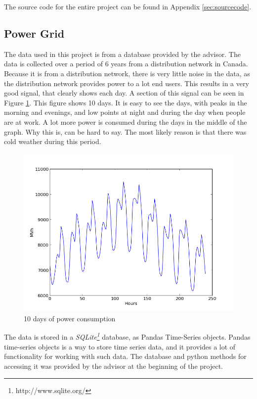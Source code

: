 \documentclass[12pt]{article}
\begin{document}
	The source code for the entire project can be found in Appendix \ref{sec:sourcecode}.
	\subsection{Power Grid}
		\label{sec:powergrid}
		The data used in this project is from a database provided by the advisor. The data is collected over a period of 6 years from a distribution network in Canada. Because it is from a distribution network, there is very little noise in the data, as the distribution network provides power to a lot end users. This results in a very good signal, that clearly shows each day. A section of this signal can be seen in Figure \ref{fig:10days}. This figure shows 10 days. It is easy to see the days, with peaks in the morning and evenings, and low points at night and during the day when people are at work. A lot more power is consumed during the days in the middle of the graph. Why this is, can be hard to say. The most likely reason is that there was cold weather during this period.
		
		\begin{figure}[h]
		\centering
		\includegraphics[width = \textwidth]{10days}
		\caption{10 days of power consumption}
		\label{fig:10days}
		\end{figure}
		
		The data is stored in a \textit{SQLite\footnote{http://www.sqlite.org/}} database, as Pandas Time-Series objects. Pandas time-series objects is a way to store time series data, and it provides a lot of functionality for working with such data. The database and python methods for accessing it was provided by the advisor at the beginning of the project.
		
\end{document}
